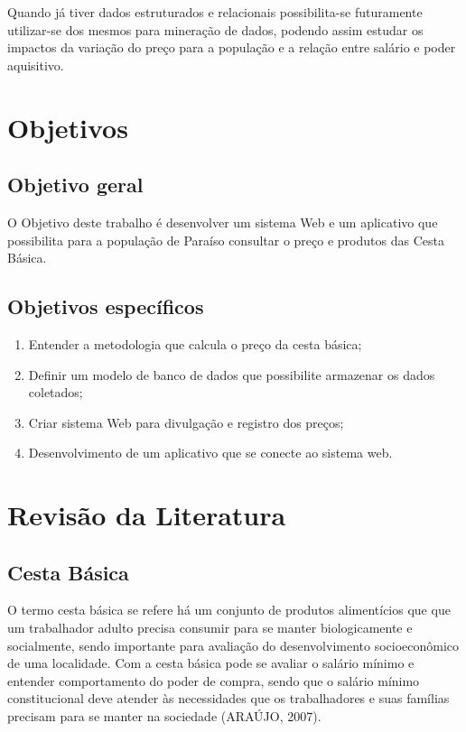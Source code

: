 \documentclass{ifto-tex}
\begin{document}
		Quando já tiver dados estruturados e relacionais possibilita-se futuramente utilizar-se dos mesmos para mineração de dados, podendo assim estudar os impactos da variação do preço para a população e a relação entre salário e poder aquisitivo.
		
	
\chapter{Objetivos}
	
	\section{Objetivo geral}
	
		O Objetivo deste trabalho é desenvolver um sistema Web e um aplicativo que possibilita para a população de Paraíso consultar o preço e produtos das Cesta Básica.
	
	\section{Objetivos específicos}
	
		\begin{enumerate}
			\item Entender a metodologia que calcula o preço da cesta básica;
			\item Definir um modelo de banco de dados que possibilite armazenar os dados coletados;
			\item Criar sistema Web para divulgação e registro dos preços;
			\item Desenvolvimento de um aplicativo que se conecte ao sistema web.
		\end{enumerate}

\chapter{Revisão da Literatura}
	\section{Cesta Básica}
	O termo cesta básica se refere há um conjunto de produtos alimentícios que que um trabalhador adulto precisa consumir para se manter biologicamente e socialmente, sendo importante para avaliação do desenvolvimento socioeconômico de uma localidade. Com a cesta básica pode se avaliar o salário mínimo e entender comportamento do poder de compra, sendo que o salário mínimo constitucional deve atender às necessidades que os trabalhadores e suas famílias precisam para se manter na sociedade (ARAÚJO, 2007).
	
\end{document}
